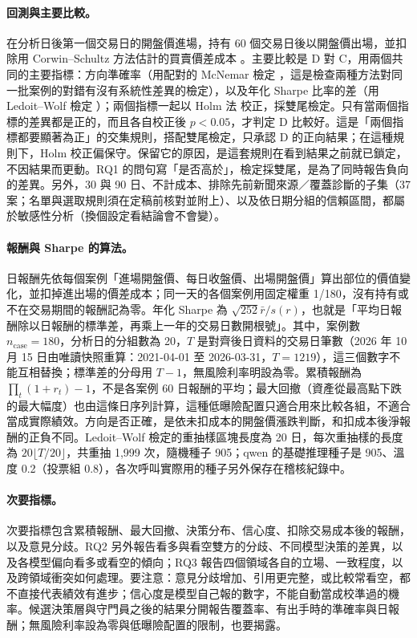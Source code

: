 \documentclass[12pt,a4paper]{article}
\numberwithin{table}{section}
\numberwithin{figure}{section}
\newcommand{\grp}[1]{\textsf{#1}}
\begin{document}
\paragraph{回測與主要比較。} 在分析日後第一個交易日的開盤價進場，持有 60 個交易日後以開盤價出場，並扣除用 Corwin--Schultz 方法估計的買賣價差成本 \citep{corwin2012spread}。主要比較是 \grp{D} 對 \grp{C}，用兩個共同的主要指標：方向準確率（用配對的 McNemar 檢定 \citep{mcnemar1947}，這是檢查兩種方法對同一批案例的對錯有沒有系統性差異的檢定），以及年化 Sharpe 比率的差（用 Ledoit--Wolf 檢定 \citep{ledoit2008sharpe}）；兩個指標一起以 Holm 法 \citep{holm1979} 校正，採雙尾檢定。只有當兩個指標的差異都是正的，而且各自校正後 $p<0.05$，才判定 \grp{D} 比較好。這是「兩個指標都要顯著為正」的交集規則，搭配雙尾檢定，只承認 \grp{D} 的正向結果；在這種規則下，Holm 校正偏保守。保留它的原因，是這套規則在看到結果之前就已鎖定，不因結果而更動。RQ1 的問句寫「是否高於」，檢定採雙尾，是為了同時報告負向的差異。另外，30 與 90 日、不計成本、排除先前新聞來源／覆蓋診斷的子集（37 案；名單與選取規則須在定稿前核對並附上）、以及依日期分組的信賴區間，都屬於敏感性分析（換個設定看結論會不會變）。

\paragraph{報酬與 Sharpe 的算法。} 日報酬先依每個案例「進場開盤價、每日收盤價、出場開盤價」算出部位的價值變化，並扣掉進出場的價差成本；同一天的各個案例用固定權重 1/180，沒有持有或不在交易期間的報酬記為零。年化 Sharpe 為 $\sqrt{252}\bar r/s(r)$，也就是「平均日報酬除以日報酬的標準差，再乘上一年的交易日數開根號」。其中，案例數 $n_{\mathrm{case}}=180$，分析日的分組數為 20，$T$ 是對齊後日資料的交易日筆數（2026 年 10 月 15 日由唯讀快照重算：2021-04-01 至 2026-03-31，$T=1219$），這三個數字不能互相替換；標準差的分母用 $T-1$，無風險利率明設為零。累積報酬為 $\prod_t(1+r_t)-1$，不是各案例 60 日報酬的平均；最大回撤（資產從最高點下跌的最大幅度）也由這條日序列計算，這種低曝險配置只適合用來比較各組，不適合當成實際績效。方向是否正確，是依未扣成本的開盤價漲跌判斷，和扣成本後淨報酬的正負不同。Ledoit--Wolf 檢定的重抽樣區塊長度為 20 日，每次重抽樣的長度為 $20\lfloor T/20\rfloor$，共重抽 1,999 次，隨機種子 905；qwen 的基礎推理種子是 905、溫度 0.2（投票組 0.8），各次呼叫實際用的種子另外保存在稽核紀錄中。

\paragraph{次要指標。} 次要指標包含累積報酬、最大回撤、決策分布、信心度、扣除交易成本後的報酬，以及意見分歧。RQ2 另外報告看多與看空雙方的分歧、不同模型決策的差異，以及各模型偏向看多或看空的傾向；RQ3 報告四個領域各自的立場、一致程度，以及跨領域衝突如何處理。要注意：意見分歧增加、引用更完整，或比較常看空，都不直接代表績效有進步；信心度是模型自己報的數字，不能自動當成校準過的機率。候選決策層與守門員之後的結果分開報告覆蓋率、有出手時的準確率與日報酬；無風險利率設為零與低曝險配置的限制，也要揭露。
\end{document}
